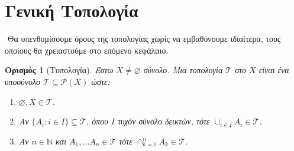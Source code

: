 \documentclass[oneside,a4paper]{article}
\newtheorem*{defn}{Ορισμός}
\newcommand{\Q}{\mathbb{Q}}
\begin{document}
\begin{center}
\end{center}




















\pagebreak
\section{Γενική Τοπολογία}




$ $\newline
Θα υπενθυμίσουμε όρους της τοπολογίας χωρίς να εμβαθύνουμε ιδιαίτερα, τους οποίους θα χρειαστούμε στο επόμενο κεφάλαιο.

\begin{defn}[Τοπολογία] Έστω $X \neq \varnothing$ σύνολο. Μια τοπολογία $\mathcal T$ στο $X$ είναι ένα υποσύνολο $\mathcal T \subseteq \mathcal P (X)$ ώστε:
	\begin{enumerate}
		\item $\varnothing, X \in \mathcal T$.
		\item Αν $\{A_i: i \in I\} \subseteq \mathcal T$, όπου $I$ τυχόν σύνολο δεικτών, τότε $\cup_{i \in I} A_i \in \mathcal T$.
		\item Αν $n\in \mathbb N$ και $A_1, \ldots A_n \in \mathcal T$ τότε $\cap_{k=1}^n A_k \in \mathcal T$.
	\end{enumerate}
\end{defn}
\end{document}
